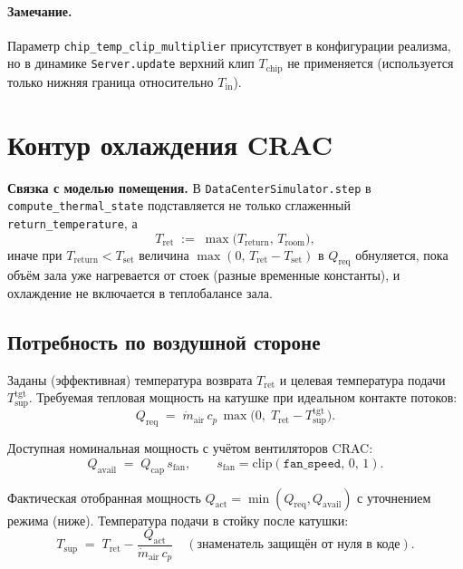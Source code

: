 \documentclass[12pt,a4paper]{article}
\begin{document}
\paragraph{Замечание.}
Параметр \texttt{chip\_temp\_clip\_multiplier} присутствует в конфигурации реализма, но в динамике
\texttt{Server.update} верхний клип $T_{\mathrm{chip}}$ не применяется (используется только нижняя граница
относительно $T_{\mathrm{in}}$).

\section{Контур охлаждения CRAC}

\noindent\textbf{Связка с моделью помещения.}
В \texttt{DataCenterSimulator.step} в \texttt{compute\_thermal\_state} подставляется не только
сглаженный \texttt{return\_temperature}, а
\begin{equation}
  T_{\mathrm{ret}} \;:=\; \max\bigl(T_{\mathrm{return}},\, T_{\mathrm{room}}\bigr),
\end{equation}
иначе при $T_{\mathrm{return}} < T_{\mathrm{set}}$ величина
$\max(0,\,T_{\mathrm{ret}} - T_{\mathrm{set}})$ в $Q_{\mathrm{req}}$ обнуляется, пока объём зала уже
нагревается от стоек (разные временные константы), и охлаждение не включается в теплобалансе зала.

\subsection{Потребность по воздушной стороне}
Заданы (эффективная) температура возврата $T_{\mathrm{ret}}$ и целевая температура подачи
$T_{\mathrm{sup}}^{\mathrm{tgt}}$. Требуемая тепловая мощность на катушке при идеальном контакте потоков:
\begin{equation}
  Q_{\mathrm{req}} \;=\; \dot m_{\mathrm{air}}\, c_p\, \max\bigl(0,\; T_{\mathrm{ret}} - T_{\mathrm{sup}}^{\mathrm{tgt}}\bigr).
\end{equation}

Доступная номинальная мощность с учётом вентиляторов CRAC:
\begin{equation}
  Q_{\mathrm{avail}} \;=\; Q_{\mathrm{cap}}\, s_{\mathrm{fan}}, \qquad s_{\mathrm{fan}} = \mathrm{clip}(\texttt{fan\_speed},\,0,\,1).
\end{equation}

Фактическая отобранная мощность $Q_{\mathrm{act}} = \min(Q_{\mathrm{req}}, Q_{\mathrm{avail}})$ с уточнением режима
(ниже). Температура подачи в стойку после катушки:
\begin{equation}
  T_{\mathrm{sup}} \;=\; T_{\mathrm{ret}} - \frac{Q_{\mathrm{act}}}{\dot m_{\mathrm{air}}\, c_p}
  \quad (\text{знаменатель защищён от нуля в коде}).
\end{equation}
\end{document}
